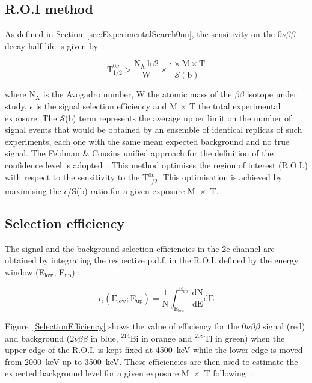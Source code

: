 \documentclass[main.tex]{subfiles}
\begin{document}
\subsection{R.O.I method}\label{sec:ROImethod}


\NI As defined in Section~\ref{sec:ExperimentalSearch0nu}, the sensitivity on the 0$\nu\beta\beta$ decay half-life is given by~:


\begin{equation}\label{eq:limitHalfLife}
\text{T}_{\text{1/2}}^{\text{0}\nu} > \frac{\text{N}_\text{A}~\text{ln2}}{\text{W}} \times \frac{\epsilon \times \text{M} \times \text{T}}{\mathcal{S}(\text{b})}
\end{equation}


\NI where N$_\text{A}$ is the Avogadro number, W the atomic mass of the $\beta\beta$ isotope under study, $\epsilon$ is the signal selection efficiency and M $\times$ T the total experimental exposure. The $\mathcal{S}$(b) term represents the average upper limit on the number of signal events that would be obtained by an ensemble of identical replicas of such experiments, each one with the same mean expected background and no true signal. The Feldman \& Cousins unified approach for the definition of the confidence level is adopted~\cite{FeldmanCousins}. This method optimises the region of interest (R.O.I.) with respect to the sensitivity to the T$_{\text{1/2}}^{\text{0}\nu}$. This optimisation is achieved by maximising the $\epsilon$/S(b) ratio for a given exposure M~$\times$~T.


\subsection{Selection efficiency}


\NI The signal and the background selection efficiencies in the 2e channel are obtained by integrating the respective p.d.f. in the R.O.I. defined by the energy window (E$_{\text{low}}$, E$_{\text{up}}$) : 


\begin{equation}\label{eq:CompuationEfficiency}
\epsilon_\text{i} (\text{E}_{\text{low}};\text{E}_{\text{up}}) = \frac{1}{\text{N}} \int_{\text{E}_{\text{low}}}^{\text{E}_{\text{up}}} \frac{\text{dN}}{\text{dE}} \text{dE}
\end{equation}


\bigskip


\NI Figure~\ref{SelectionEfficiency} shows the value of efficiency for the 0$\nu\beta\beta$ signal (red) and background (2$\nu\beta\beta$ in blue, $^{\text{214}}$Bi in orange and $^{\text{208}}$Tl in green) when the upper edge of the R.O.I. is kept fixed at 4500~keV while the lower edge is moved from 2000~keV up to 3500~keV. These efficiencies are then used to estimate the expected background level for a given exposure M~$\times$~T following~:
\end{document}
